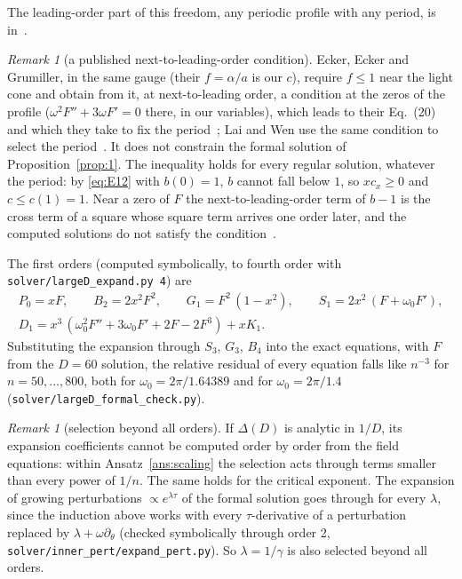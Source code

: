 \documentclass{amsart}
\numberwithin{equation}{section}
\theoremstyle{plain}
\theoremstyle{definition}
\theoremstyle{remark}
\newtheorem{remark}[definition]{Remark}
\newcommand{\repo}[1]{\texttt{#1}}
\begin{document}
The leading-order part of this freedom, any periodic profile with any period, is in~\cite{EckerEckerGrumiller2026}.

\begin{remark}[a published next-to-leading-order condition]\label{rem:eeg}
Ecker, Ecker and Grumiller, in the same gauge (their $f = \alpha/a$ is our $c$), require $f \le 1$ near the light cone and
obtain from it, at next-to-leading order, a condition at the zeros of the profile ($\omega^2F'' + 3\omega F' = 0$ there,
in our variables), which leads to their Eq.~(20) and which they take to fix the period~\cite{EckerEckerGrumiller2026}; Lai
and Wen use the same condition to select the period~\cite{LaiWen2026}. It does not constrain the formal solution of
Proposition~\ref{prop:1}. The inequality holds for every regular solution, whatever the period: by \eqref{eq:E12} with
$b(0) = 1$, $b$ cannot fall below $1$, so $xc_x \ge 0$ and $c \le c(1) = 1$. Near a zero of $F$ the next-to-leading-order
term of $b - 1$ is the cross term of a square whose square term arrives one order later, and the computed solutions do
not satisfy the condition~\cite{companion}.
\end{remark}

The first orders (computed symbolically, to fourth order with \repo{solver/largeD\_expand.py 4}) are
\begin{equation}\label{eq:firstorders}
\begin{gathered}
P_0 = xF,\qquad B_2 = 2x^2F^2,\qquad G_1 = F^2\,(1-x^2),\qquad S_1 = 2x^2\,(F + \omega_0 F'),\\
D_1 = x^3\,(\omega_0^2 F'' + 3\omega_0 F' + 2F - 2F^3) + xK_1 .
\end{gathered}
\end{equation}
Substituting the expansion through $S_3$, $G_3$, $B_4$ into the exact equations, with $F$ from the $D = 60$ solution, the
relative residual of every equation falls like $n^{-3}$ for $n = 50, \dots, 800$, both for $\omega_0 = 2\pi/1.64389$ and
for $\omega_0 = 2\pi/1.4$ (\repo{solver/largeD\_formal\_check.py}).

\begin{remark}[selection beyond all orders]\label{rem:beyond}
If $\Delta(D)$ is analytic in $1/D$, its expansion coefficients cannot be computed order by order from the field
equations: within Ansatz~\ref{ans:scaling} the selection acts through terms smaller than every power of $1/n$. The same
holds for the critical exponent. The expansion of growing perturbations $\propto e^{\lambda\tau}$ of the formal solution
goes through for every $\lambda$, since the induction above works with every $\tau$-derivative of a perturbation replaced
by $\lambda + \omega\partial_\theta$ (checked symbolically through order 2, \repo{solver/inner\_pert/expand\_pert.py}). So
$\lambda = 1/\gamma$ is also selected beyond all orders.
\end{remark}
\end{document}
